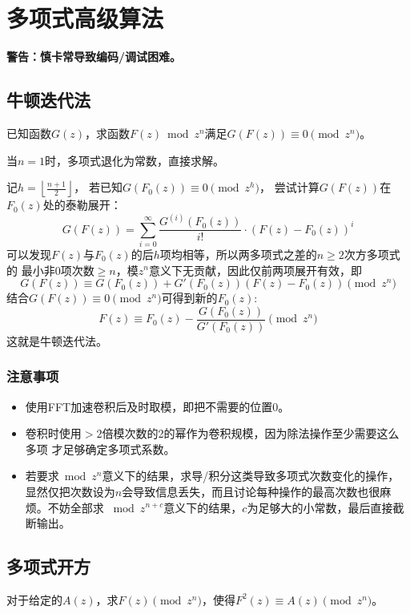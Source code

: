 \section{多项式高级算法}
{\bfseries 警告：慎卡常导致编码/调试困难。}

\subsection{牛顿迭代法}
已知函数$G(z)$，求函数$F(z) \bmod{z^n}$满足$G(F(z))\equiv 0 \pmod{z^n}$。

当$n=1$时，多项式退化为常数，直接求解。

记$h=\left\lfloor\frac{n+1}{2}\right\rfloor$，
若已知$G(F_0(z)) \equiv 0\pmod{z^h}$，
尝试计算$G(F(z))$在$F_0(z)$处的泰勒展开：
\begin{displaymath}
    G(F(z))=\sum_{i=0}^\infty{\frac{G^{(i)}(F_0(z))}{i!}\cdot (F(z)-F_0(z))^i}
\end{displaymath}
可以发现$F(z)$与$F_0(z)$的后$h$项均相等，所以两多项式之差的$n\geq 2$次方多项式的
最小非0项次数$\geq n$，模$z^n$意义下无贡献，因此仅前两项展开有效，即
\begin{displaymath}
    G(F(z))\equiv G(F_0(z))+G'(F_0(z))(F(z)-F_0(z)) \pmod{z^n}
\end{displaymath}
结合$G(F(z))\equiv 0 \pmod{z^n}$可得到新的$F_0(z)$:
\begin{displaymath}
    F(z)\equiv F_0(z)-\frac{G(F_0(z))}{G'(F_0(z))} \pmod{z^n}
\end{displaymath}
这就是牛顿迭代法。

\subsubsection{注意事项}
\begin{itemize}
    \item 使用FFT加速卷积后及时取模，即把不需要的位置0。
    \item 卷积时使用$>2$倍模次数的2的幂作为卷积规模，因为除法操作至少需要这么多项
    才足够确定多项式系数。
    \item 若要求$\bmod{z^n}$意义下的结果，求导/积分这类导致多项式次数变化的操作，
    显然仅把次数设为$n$会导致信息丢失，而且讨论每种操作的最高次数也很麻烦。不妨全部求
    $\bmod{z^{n+c}}$意义下的结果，$c$为足够大的小常数，最后直接截断输出。
\end{itemize}

\subsection{多项式开方}
对于给定的$A(z)$，求$F(z) \pmod{z^n}$，使得$F^2(z)\equiv A(z)\pmod{z^n}$。

